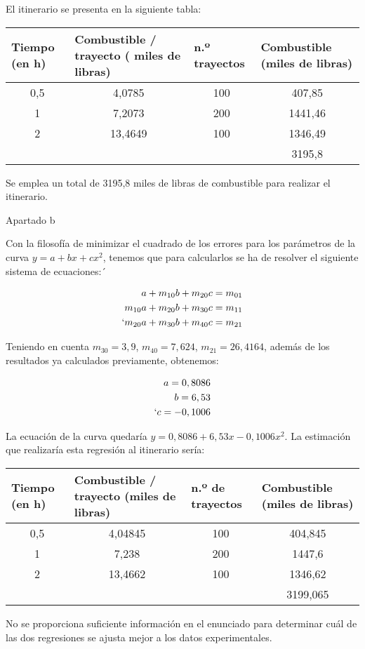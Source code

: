 \documentclass{article}
\begin{document}
El itinerario se presenta en la siguiente tabla: 

\tiny
	\begin{center}
		\begin{tabular}{|c|c|c|c|}
			\hline
			\multicolumn{1}{|l|}{Tiempo (en h)} & \multicolumn{1}{l|}{Combustible / trayecto ( miles de libras)} & \multicolumn{1}{l|}{n.º trayectos} & \multicolumn{1}{l|}{Combustible (miles de libras)} \\ \hline
			0,5 & 4,0785 & 100 & 407,85 \\ 
			1 & 7,2073 & 200 & 1441,46 \\ 
			2 & 13,4649 & 100 & 1346,49 \\ \hline
			\multicolumn{1}{|l|}{} & \multicolumn{1}{l|}{} &  & 3195,8 \\ \hline
		\end{tabular}
	\end{center}
\normalsize

Se emplea un total de 3195,8 miles de libras de combustible para realizar el itinerario.

Apartado b

Con la filosofía de minimizar el cuadrado de los errores para los parámetros de la curva $y = a +bx+cx^2$, tenemos que para calcularlos se ha de resolver el siguiente sistema de ecuaciones:´

\begin{eqnarray}
\nonumber
a+ m_{10}b + m_{20}c = m_{01} \\
\nonumber
m_{10}a +m_{20}b + m_{30}c = m_{11} \\
\nonumber`
m_{20}a +m_{30}b + m_{40}c = m_{21}
\end{eqnarray}

Teniendo en cuenta $m_{30} = 3,9$, $m_{40}=7,624$, $m_{21} = 26,4164$, además de los resultados ya calculados previamente, obtenemos: 

\begin{eqnarray}
\nonumber
a=0,8086 \\
\nonumber
b=6,53 \\
\nonumber`
c=-0,1006
\end{eqnarray}

La ecuación de la curva quedaría $y=0,8086+6,53x-0,1006x^2$. La estimación que realizaría esta regresión al itinerario sería:
\tiny
	\begin{center}
		\begin{tabular}{|c|c|c|c|}
			\hline
			\multicolumn{1}{|l|}{Tiempo (en h)} & \multicolumn{1}{l|}{Combustible / trayecto (miles de libras)} & \multicolumn{1}{l|}{n.º de trayectos} & \multicolumn{1}{l|}{Combustible (miles de libras)} \\ \hline
			0,5 & 4,04845 & 100 & 404,845 \\ 
			1 & 7,238 & 200 & 1447,6 \\ 
			2 & 13,4662 & 100 & 1346,62 \\ \hline
			\multicolumn{1}{|l|}{} & \multicolumn{1}{l|}{} &  & 3199,065 \\ \hline
		\end{tabular}
	\end{center}
\normalsize




No se proporciona suficiente información en el enunciado para determinar cuál de las dos regresiones se ajusta mejor a los datos experimentales. 
\end{document}

